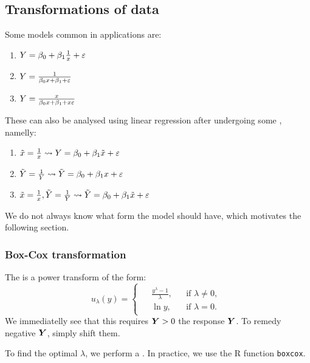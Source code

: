 
\subsection{Transformations of data}
Some models common in applications are:
\begin{enumerate}
    \item $Y=\beta_0+\beta_1\frac{1}{x}+\varepsilon$
    \item $Y=\frac{1}{\beta_0 x + \beta_1 + \varepsilon}$
    \item $Y=\frac{x}{\beta_0 x + \beta_1 + x\varepsilon}$
\end{enumerate}
These can also be analysed using linear regression after undergoing some , namelly:
\begin{enumerate}
    \item $\tilde{x}=\frac{1}{x} \leadsto Y=\beta_0+\beta_1\tilde{x}+\varepsilon$
    \item $\tilde{Y}=\frac{1}{Y} \leadsto \tilde{Y}=\beta_0+\beta_1{x}+\varepsilon$
    \item $\tilde{x}=\frac{1}{x},\tilde{Y}=\frac{1}{Y} \leadsto \tilde{Y}=\beta_0+\beta_1\tilde{x}+\varepsilon$
\end{enumerate}
We do not always know what form the model should have, which motivates the following section.

\subsubsection{Box-Cox transformation}
The  is a power transform of the form:
\[
u_{\lambda}(y) =
\begin{cases}
    \begin{aligned}
        &\frac{y^\lambda-1}{\lambda}, && \text{if } \lambda \ne 0, \\
        &\ln{y}, && \text{if } \lambda = 0.
    \end{aligned}
\end{cases}
\]
We immediatelly see that this requires $\boldsymbol{Y}>0$ the response $\boldsymbol{Y}$. To remedy negative $\boldsymbol{Y}$, simply shift them. 


To find the optimal $\lambda$, we perform a . In practice, we use the R function \texttt{boxcox}. 

